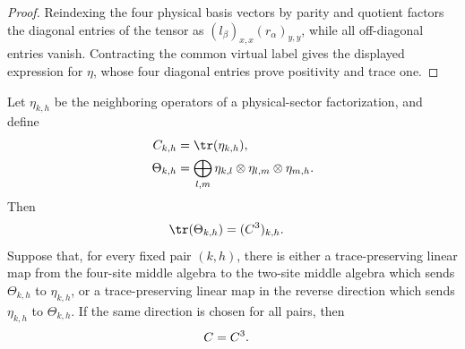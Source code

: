 \begin{proof}\leanok
    Reindexing the four physical basis vectors by parity and quotient factors
    the diagonal entries of the tensor as
    $(l_\beta)_{x,x}(r_\alpha)_{y,y}$, while all off-diagonal entries vanish.
    Contracting the common virtual label gives the displayed expression for
    $\eta$, whose four diagonal entries prove positivity and trace one.
\end{proof}

\begin{lemma}
    \label{thm:mpdo_pair_preserving_trace_obstruction}
    \leanok
    Let $\eta_{k,h}$ be the neighboring operators of a physical-sector
    factorization, and define
    \begin{align}
        C_{k,h}
         & =\tr(\eta_{k,h}),
        \notag               \\
        \Theta_{k,h}
         & =\bigoplus_{l,m}
        \eta_{k,l}\otimes\eta_{l,m}\otimes\eta_{m,h}.
        \notag
    \end{align}
    Then
    \begin{align}
        \tr(\Theta_{k,h})
         & =(C^3)_{k,h}.
        \notag
    \end{align}
    Suppose that, for every fixed pair $(k,h)$, there is either a
    trace-preserving linear map from the four-site middle algebra to the
    two-site middle algebra which sends $\Theta_{k,h}$ to $\eta_{k,h}$, or a
    trace-preserving linear map in the reverse direction which sends
    $\eta_{k,h}$ to $\Theta_{k,h}$.  If the same direction is chosen for all
    pairs, then
    \begin{align}
        C & =C^3.
        \notag
    \end{align}
\end{lemma}

